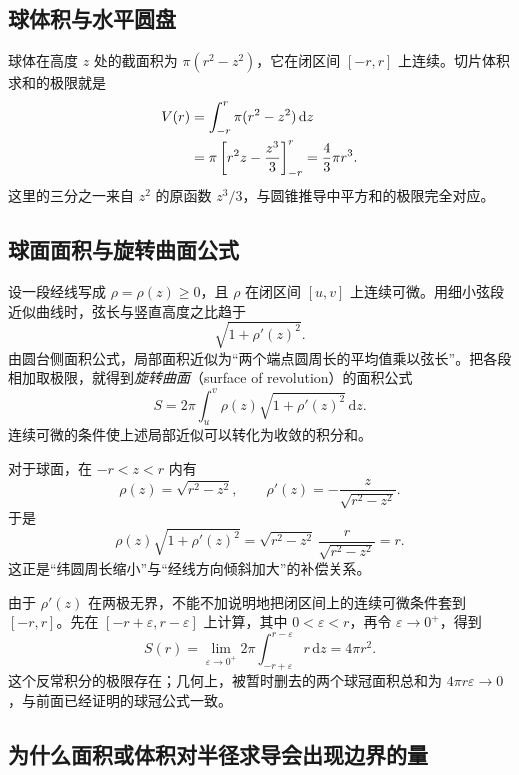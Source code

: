 \documentclass[UTF8,12pt,a4paper,fontset=fandol]{ctexart}
\begin{document}
\subsection{球体积与水平圆盘}

球体在高度 $z$ 处的截面积为 $\pi(r^2-z^2)$，它在闭区间 $[-r,r]$ 上连续。切片体积求和的极限就是
\begin{align}
  V(r)
  &=\int_{-r}^{r}\pi(r^2-z^2)\,\mathrm{d}z\notag\\
  &=\pi\left[r^2z-\frac{z^3}{3}\right]_{-r}^{r}
   =\frac43\pi r^3.
  \label{eq:cs-volume-integral}
\end{align}
这里的三分之一来自 $z^2$ 的原函数 $z^3/3$，与圆锥推导中平方和的极限完全对应。

\subsection{球面面积与旋转曲面公式}

设一段经线写成 $\rho=\rho(z)\geq0$，且 $\rho$ 在闭区间 $[u,v]$ 上连续可微。用细小弦段近似曲线时，弦长与竖直高度之比趋于
\[
  \sqrt{1+\rho'(z)^2}.
\]
由圆台侧面积公式，局部面积近似为“两个端点圆周长的平均值乘以弦长”。把各段相加取极限，就得到\emph{旋转曲面}（surface of revolution）的面积公式
\begin{equation}\label{eq:cs-revolution-area}
  S=2\pi\int_u^v\rho(z)\sqrt{1+\rho'(z)^2}\,\mathrm{d}z.
\end{equation}
连续可微的条件使上述局部近似可以转化为收敛的积分和。

对于球面，在 $-r<z<r$ 内有
\[
  \rho(z)=\sqrt{r^2-z^2},\qquad
  \rho'(z)=-\frac{z}{\sqrt{r^2-z^2}}.
\]
于是
\begin{equation}\label{eq:cs-area-compensation}
  \rho(z)\sqrt{1+\rho'(z)^2}
  =\sqrt{r^2-z^2}\,\frac{r}{\sqrt{r^2-z^2}}
  =r.
\end{equation}
这正是“纬圆周长缩小”与“经线方向倾斜加大”的补偿关系。

由于 $\rho'(z)$ 在两极无界，不能不加说明地把闭区间上的连续可微条件套到 $[-r,r]$。先在 $[-r+\varepsilon,r-\varepsilon]$ 上计算，其中 $0<\varepsilon<r$，再令 $\varepsilon\to0^+$，得到
\begin{equation}\label{eq:cs-surface-integral}
  S(r)=\lim_{\varepsilon\to0^+}
  2\pi\int_{-r+\varepsilon}^{r-\varepsilon}r\,\mathrm{d}z
  =4\pi r^2.
\end{equation}
这个反常积分的极限存在；几何上，被暂时删去的两个球冠面积总和为 $4\pi r\varepsilon\to0$，与前面已经证明的球冠公式一致。

\subsection{为什么面积或体积对半径求导会出现边界的量}
\end{document}
